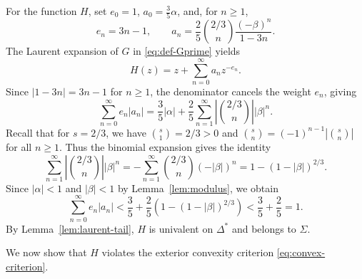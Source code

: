 \documentclass[11pt,reqno]{amsart}
\theoremstyle{definition}
\begin{document}
For the function $H$, set $e_0=1$, $a_0=\frac35\alpha$, and, for $n\geq1$,
\[
e_n=3n-1, \qquad
a_n=\frac25\binom{2/3}{n}\frac{(-\beta)^n}{1-3n}.
\]
The Laurent expansion of $G$ in \eqref{eq:def-Gprime} yields
\[
H(z)=z+\sum_{n=0}^{\infty}a_nz^{-e_n}.
\]
Since $|1-3n| = 3n-1$ for $n \ge 1$, the denominator cancels the weight $e_n$, giving
\begin{equation}\label{eq:H-tail-bound}
\sum_{n=0}^{\infty}e_n|a_n|
=\frac35|\alpha|+\frac25\sum_{n=1}^{\infty}
\left|\binom{2/3}{n}\right||\beta|^n.
\end{equation}
Recall that for $s = 2/3$, we have $\binom{s}{1} = 2/3 > 0$ and $\binom{s}{n} = (-1)^{n-1}\left|\binom{s}{n}\right|$ for all $n \ge 1$. Thus the binomial expansion gives the identity
\begin{equation}\label{eq:binomial-identity}
\sum_{n=1}^{\infty} \left|\binom{2/3}{n}\right| |\beta|^n
= -\sum_{n=1}^{\infty} \binom{2/3}{n} (-|\beta|)^n
= 1 - (1 - |\beta|)^{2/3}.
\end{equation}
Since $|\alpha| < 1$ and $|\beta| < 1$ by Lemma~\ref{lem:modulus}, we obtain
\begin{equation}
\sum_{n=0}^{\infty}e_n|a_n| < \frac{3}{5} + \frac{2}{5}\left(1 - (1 - |\beta|)^{2/3}\right) < \frac{3}{5} + \frac{2}{5} = 1.
\end{equation}
By Lemma~\ref{lem:laurent-tail}, $H$ is univalent on $\Delta^*$ and belongs to $\Sigma$.

We now show that $H$ violates the exterior convexity criterion \eqref{eq:convex-criterion}.
\end{document}
